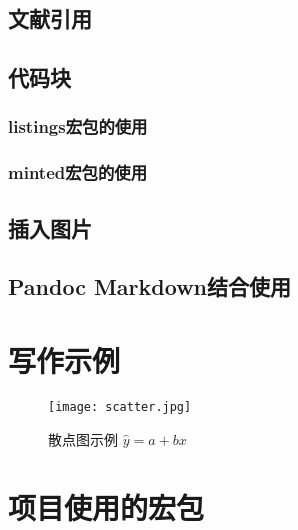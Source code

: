 \documentclass[10pt, twocolumn, compact, crimson]{uglypaper}
\begin{document}
\subsection{文献引用}


\subsection{代码块}


\subsubsection{listings宏包的使用}

\subsubsection{minted宏包的使用}


\subsection{插入图片}


\subsection{Pandoc Markdown结合使用}


\section{写作示例}


\begin{figure}[htbp]
  \centering
  \texttt{[image: scatter.jpg]}
  \caption{散点图示例 $\hat{y}=a+bx$ \label{fig:scatter}}
\end{figure}



\section{项目使用的宏包}


\printbibliography[
  title=\ebibname]

\end{document}
